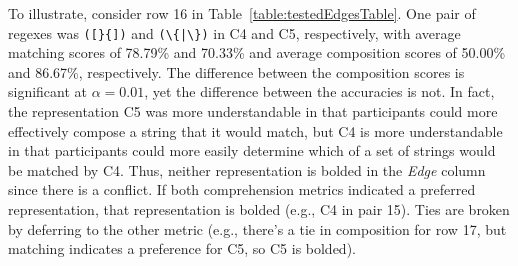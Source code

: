 
To illustrate, consider row 16 in Table~\ref{table:testedEdgesTable}.
One pair of regexes was \verb!([}{])! and \verb!(\{|\})! in C4 and C5, respectively, with average matching scores of 78.79\%  and 70.33\%  and average composition scores of 50.00\%  and 86.67\%, respectively.
The difference between the composition scores is significant at $\alpha = 0.01$, yet the difference between the accuracies is not. 
In fact, the representation C5 was more understandable in that participants could more effectively compose a string that it would match, but C4 is more understandable in that participants could more easily determine which of a set of strings would be matched by C4. Thus, neither representation is bolded in the \emph{Edge} column since there is a conflict. 
If both comprehension metrics indicated a preferred representation, that representation is bolded (e.g., C4 in pair 15). Ties are broken by deferring to the other metric (e.g., there's a tie in composition for row 17, but matching indicates a preference for C5, so C5 is bolded).


%

